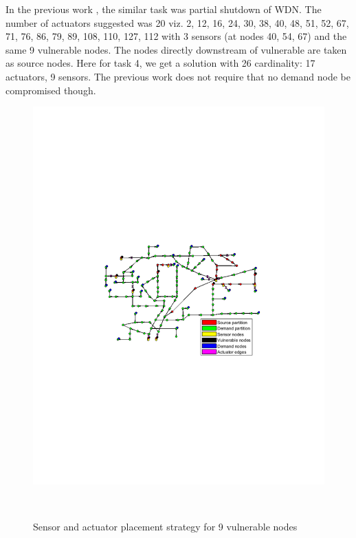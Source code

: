 \documentclass[authoryear,preprint,review,12pt]{elsarticle}
\begin{document}
In the previous work \cite{palleti_actuator_2018}, the similar task was partial shutdown
of WDN. The number of actuators suggested was 20 viz. 2, 12, 16, 24,
30, 38, 40, 48, 51, 52, 67, 71, 76, 86, 79, 89, 108, 110, 127, 112
with 3 sensors (at nodes 40, 54, 67) and the same 9 vulnerable nodes.
The nodes directly downstream of vulnerable are taken as source nodes.
Here for task 4, we get a solution with 26 cardinality: 17 actuators,
9 sensors. The previous work does not require that no demand node
be compromised though.

\begin{figure}[ht]
\includegraphics[width=\linewidth]{images/zoneContainment_9sources_legend}
\caption{Sensor and actuator placement strategy for 9 vulnerable nodes\protect} \\
    \label{fig:zoneContainment_9sources}
\end{figure}
\end{document}
